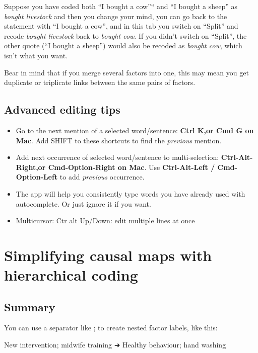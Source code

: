 \documentclass[
]{book}
\providecommand{\tightlist}{%
  \setlength{\itemsep}{0pt}\setlength{\parskip}{0pt}}
\begin{document}
Suppose you have coded both ``I bought a cow''`` and ``I bought a sheep'' as \emph{bought livestock} and then you change your mind, you can go back to the statement with ``I bought a cow'', and in this tab you switch on ``Split'' and recode \emph{bought livestock} back to \emph{bought cow}. If you didn't switch on ``Split'', the other quote (``I bought a sheep'') would also be recoded as \emph{bought cow}, which isn't what you want.

Bear in mind that if you merge several factors into one, this may mean you get duplicate or triplicate links between the same pairs of factors.

\hypertarget{advanced-editing-tips}{%
\section{Advanced editing tips}\label{advanced-editing-tips}}

\begin{itemize}
\tightlist
\item
  Go to the next mention of a selected word/sentence: \textbf{Ctrl K,or Cmd G on Mac}. Add SHIFT to these shortcuts to find the \emph{previous} mention.
\item
  Add next occurrence of selected word/sentence to multi-selection: \textbf{Ctrl-Alt-Right,or Cmd-Option-Right on Mac}. Use \textbf{Ctrl-Alt-Left / Cmd-Option-Left} to add \emph{previous} occurrence.
\item
  The app will help you consistently type words you have already used with autocomplete. Or just ignore it if you want.
\item
  Multicursor: Ctr alt Up/Down: edit multiple lines at once
\end{itemize}

\hypertarget{simplifying}{%
\chapter{Simplifying causal maps with hierarchical coding}\label{simplifying}}

\hypertarget{summary-1}{%
\section{Summary}\label{summary-1}}

You can use a separator like ; to create nested factor labels, like this:

New intervention; midwife training ➜ Healthy behaviour; hand washing
\end{document}
